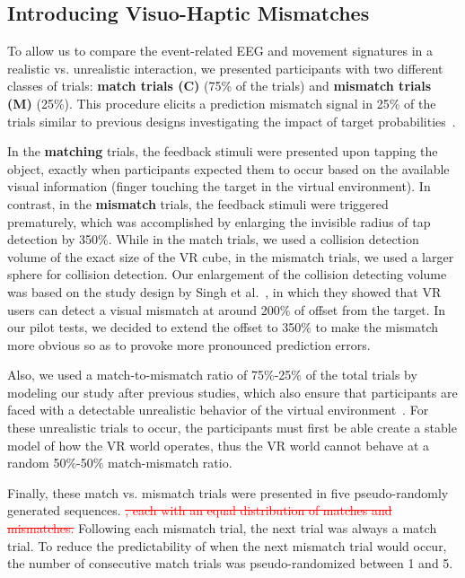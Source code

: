 \subsection{Introducing Visuo-Haptic Mismatches}
To allow us to compare the event-related EEG and movement signatures in a realistic vs. unrealistic interaction, we presented participants with two different classes of trials: \textbf{match trials (C)} (75\% of the trials) and \textbf{mismatch trials (M)} (25\%). This procedure elicits a prediction mismatch signal in 25\% of the trials similar to previous designs investigating the impact of target probabilities~\cite{Polich2007-cf}.  %

In the \textbf{matching} trials, the feedback stimuli were presented upon tapping the object, exactly when participants expected them to occur based on the available visual information (finger touching the target in the virtual environment). In contrast, in the \textbf{mismatch} trials, the feedback stimuli were triggered prematurely, which was accomplished by enlarging the invisible radius of tap detection by 350\%. While in the match trials, we used a collision detection volume of the exact size of the VR cube, in the mismatch trials, we used a larger sphere for collision detection. Our enlargement of the collision detecting volume was based on the study design by Singh et al.~\cite{Singh2018-qi}, in which they showed that VR users can detect a visual mismatch at around 200\% of offset from the target. In our pilot tests, we decided to extend the offset to 350\% to make the mismatch more obvious so as to provoke more pronounced prediction errors. 

Also, we used a match-to-mismatch ratio of 75\%-25\% of the total trials by modeling our study after previous studies, which also ensure that participants are faced with a detectable unrealistic behavior of the virtual environment~\cite{Liao2011-po,Wiersema2007-jf,Donchin1988-gq}. For these unrealistic trials to occur, the participants must first be able create a stable model of how the VR world operates, thus the VR world cannot behave at a random 50\%-50\% match-mismatch ratio. 

Finally, these match vs. mismatch trials were presented in five \textcolor{n}{pseudo-}randomly generated sequences. \textcolor{red}{\st{, each with an equal distribution of matches and mismatches.}} \textcolor{n}{Following each mismatch trial, the next trial was always a match trial. To reduce the predictability of when the next mismatch trial would occur, the number of consecutive match trials was pseudo-randomized between 1 and 5.}

